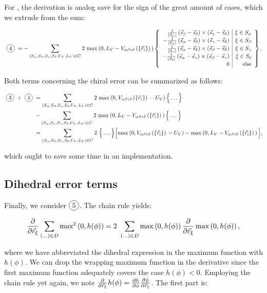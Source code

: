\documentclass[a4paper]{article}
\newcommand*\circled[1]{
  \tikz[baseline=(char.base)]{
    \node[shape=circle,draw,inner sep=2pt] (char) {#1};
  }
}
\begin{document}
For \circled{4}, the derivation is analog save for the sign of the great amount
of cases, which we extrude from the sum:

\begin{equation}
  \text{\circled{4}} = - \chiralSum 2\ \chiralErrorSecondTerm{} \left\{ \begin{array}{r | r}
    \frac{1}{|S_\alpha|} \avgVecDiff{\beta}{\delta} \times \avgVecDiff{\gamma}{\delta} & \xi \in S_\alpha\\
    - \frac{1}{|S_\beta|} \avgVecDiff{\alpha}{\delta} \times \avgVecDiff{\gamma}{\delta} & \xi \in S_\beta\\
    \frac{1}{|S_\gamma|} \avgVecDiff{\alpha}{\delta} \times \avgVecDiff{\beta}{\delta} & \xi \in S_\gamma\\
    - \frac{1}{|S_\delta|} \avgVecDiff{\alpha}{\gamma} \times \avgVecDiff{\beta}{\gamma} & \xi \in S_\delta\\
    0 & \textrm{else}
  \end{array} \right\}.
\end{equation}

Both terms concerning the chiral error can be summarized as follows:

\begin{align*}
  \text{\circled{3}} + \text{\circled{4}} &=\chiralSum 2\ \chiralErrorFirstTerm{} \Big\{ \ldots \Big\}\\
  &- \chiralSum 2\ \chiralErrorSecondTerm{} \Big\{ \ldots \Big\}\\
  &= \chiralSum 2\ \Big\{ \ldots \Big\} \Big[ 
    \chiralErrorFirstTerm{} - \chiralErrorSecondTerm{} 
  \Big],
\end{align*}

which ought to save some time in an implementation.

\newpage
\subsection{Dihedral error terms}

Finally, we consider $\circled{5}$. The chain rule yields:

\begin{equation}
  \frac{\partial}{\partial\vec{r}_{\xi}} \sum_{(\ldots) \in D} \textrm{max}^2 \left(0, h(\phi)\right)
  = 2\ \sum_{(\ldots) \in D} \max\left(0, h(\phi)\right) 
    \frac{\partial}{\partial\vec{r}_{\xi}} \max\left(0, h(\phi)\right),
\end{equation}

where we have abbreviated the dihedral expression in the maximum function
with $h(\phi)$. We can drop the wrapping maximum function in the derivative
since the first maximum function adequately covers the case
$h(\phi) < 0$. Employing the chain rule yet again, we note 
$\frac{\partial}{\partial\vec{r}_{\xi}} h(\phi) = \frac{\partial h}{\partial \phi}
\frac{\partial \phi}{\partial \vec{r}_{\xi}}$. The first part is:
\end{document}
